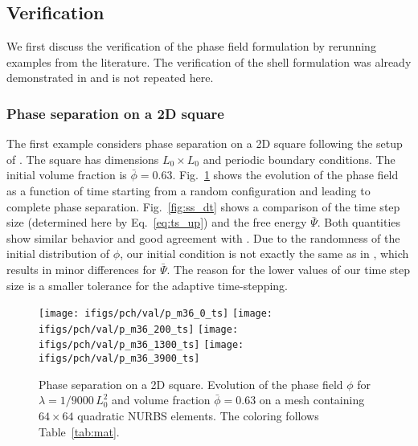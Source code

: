 \documentclass[11pt]{article}
\begin{document}
\subsection{Verification}\label{Sec:verif}

We first discuss the verification of the phase field formulation by rerunning examples from the literature. 
The verification of the shell formulation was already demonstrated in \citet{solidshell2} and is not repeated here.

\subsubsection{Phase separation on a 2D square}

The first example considers phase separation on a 2D square following the setup of \citet{gomez08-1}.
The square has dimensions $L_0\times L_0$ and periodic boundary conditions. 
The initial volume fraction is $\bar{\phi}=0.63$.
Fig.~\ref{fig:ss_evo} shows the evolution of the phase field as a function of time starting from a random configuration and leading to complete phase separation. 
Fig.~\ref{fig:ss_dt} shows a comparison of the time step size (determined here by Eq.~\eqref{eq:ts_up}) and the free energy $\bar{\Psi}$. %
Both quantities show similar behavior and good agreement with \citet{gomez08-1}. 
Due to the randomness of the initial distribution of $\phi$, our initial condition is not exactly the same as in \citet{gomez08-1}, which results in minor differences for $\bar\Psi$.
The reason for the lower values of our time step size is a smaller tolerance for the adaptive time-stepping. 
\begin{figure}
\centering
\texttt{[image: ifigs/pch/val/p\_m36\_0\_ts]}
\texttt{[image: ifigs/pch/val/p\_m36\_200\_ts]}
\texttt{[image: ifigs/pch/val/p\_m36\_1300\_ts]}
\texttt{[image: ifigs/pch/val/p\_m36\_3900\_ts]}
\caption{Phase separation on a 2D square. Evolution of the phase field $\phi$ for $\lambda=1/9000\,L_0^2$ and volume fraction $\bar{\phi} = 0.63$ on a mesh containing $64 \times 64$ quadratic NURBS elements. The coloring follows Table~\ref{tab:mat}.}
\label{fig:ss_evo}
\end{figure}
\end{document}
